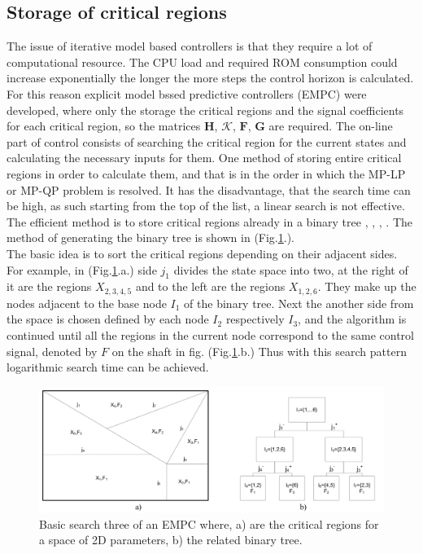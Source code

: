 \subsection{Storage of critical regions}\label{BASICCSR:sec:EMPCStorage}

The issue of iterative model based controllers is that they require a lot of computational resource. The CPU load and required ROM consumption could increase exponentially the longer the more steps the control horizon is calculated. For this reason explicit model bssed predictive controllers (EMPC) were developed, where only the storage the critical regions and the signal coefficients for each critical region, so the matrices $\textbf{H}$, $\mathcal{K}$, $\textbf{F}$, $\textbf{G}$ are required. The on-line part of control consists of searching the critical region for the current states and calculating the necessary inputs for them.
One method of storing entire critical regions in order to calculate them, and that is in the order in which the MP-LP or MP-QP problem is resolved. It has the disadvantage, that the search time can be high, as such starting from the top of the list, a linear search is not effective. The efficient method is to store critical regions already in a binary tree \cite{jones2006logarithmic}, \cite{tondel2003evaluation}, \cite{tondel2003constrained}, \cite{kutasi2008vector}. The method of generating the binary tree is shown in (Fig.\ref{BASICMPC:fig:searchtree}.).\\
 The basic idea is to sort the critical regions depending on their adjacent sides. For example, in (Fig.\ref{BASICMPC:fig:searchtree}.a.) side $j_1$ divides the state space into two, at the right of it are the regions $X_{2,3,4,5}$ and to the left are the regions $X_{1,2,6}$. They make up the nodes adjacent to the base node $I_1$ of the binary tree. Next the another side from the space is chosen defined by each node $I_2$ respectively $I_3$, and the algorithm is continued until all the regions in the current node correspond to the same control signal, denoted by $F$ on the shaft in fig. (Fig.\ref{BASICMPC:fig:searchtree}.b.) Thus with this search pattern logarithmic search time can be achieved.

 \begin{figure}[!ht]
        \centering
        \includegraphics[width=\textwidth]{EMPC_PNG_Pics/BasicSearchTree.png}
        \caption{Basic search three of an EMPC where, a) are the critical regions for a space of 2D parameters,
b) the related binary tree.}
        \label{BASICMPC:fig:searchtree}
    \end{figure}

